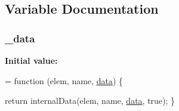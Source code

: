 \subsection{Variable Documentation}
\subsubsection[{\texorpdfstring{\+\_\+data}{_data}}]{ \+\_\+data}\hypertarget{jquery-2_82_81-vsdoc_8js_a01a70510ea17cfcb22c0ca5e079baf8c}{}\label{jquery-2_82_81-vsdoc_8js_a01a70510ea17cfcb22c0ca5e079baf8c}
{\bfseries Initial value\+:}
\begin{DoxyCode}
= \textcolor{keyword}{function} (elem, name, \hyperlink{jquery-2_82_81-vsdoc_8js_a609407b3456fdc3c5671a9fc4a226ff7}{data}) \{

        \textcolor{keywordflow}{return} internalData(elem, name, \hyperlink{jquery-2_82_81-vsdoc_8js_a609407b3456fdc3c5671a9fc4a226ff7}{data}, \textcolor{keyword}{true});
    \}
\end{DoxyCode}
